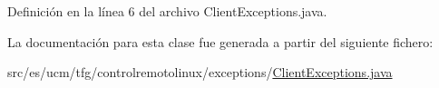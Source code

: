 Definición en la línea 6 del archivo Client\-Exceptions.\-java.



La documentación para esta clase fue generada a partir del siguiente fichero\-:\begin{DoxyCompactItemize}
\item 
src/es/ucm/tfg/controlremotolinux/exceptions/\hyperlink{ClientExceptions_8java}{Client\-Exceptions.\-java}\end{DoxyCompactItemize}
